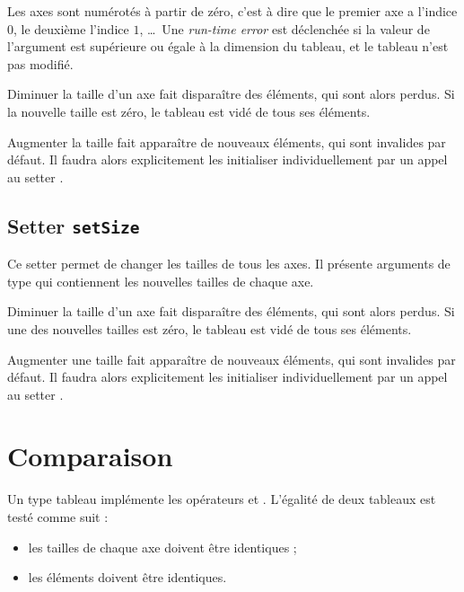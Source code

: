 Les axes sont numérotés à partir de zéro, c'est à dire que le premier axe a l'indice $0$, le deuxième l'indice $1$, \dots~Une \emph{run-time error} est déclenchée si la valeur de l'argument est supérieure ou égale à la dimension du tableau, et le tableau n'est pas modifié.
 
Diminuer la taille d'un axe fait disparaître des éléments, qui sont alors perdus. Si la nouvelle taille est zéro, le tableau est vidé de tous ses éléments.

Augmenter la taille fait apparaître de nouveaux éléments, qui sont invalides par défaut. Il faudra alors explicitement les initialiser individuellement par un appel au setter .




\subsection{Setter \texttt{setSize}}

Ce setter permet de changer les tailles de tous les axes. Il présente  arguments de type  qui contiennent les nouvelles tailles de chaque axe.

Diminuer la taille d'un axe fait disparaître des éléments, qui sont alors perdus. Si une des nouvelles tailles est zéro, le tableau est vidé de tous ses éléments.

Augmenter une taille fait apparaître de nouveaux éléments, qui sont invalides par défaut. Il faudra alors explicitement les initialiser individuellement par un appel au setter .


\section{Comparaison}

Un type tableau implémente les opérateurs \galgas{=} et \galgas{\!=}. L'égalité de deux tableaux est testé comme suit :
\begin{itemize}
  \item les tailles de chaque axe doivent être identiques ;
  \item les éléments doivent être identiques.
\end {itemize}
